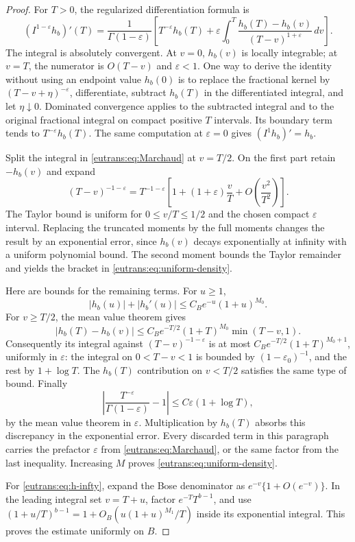 \begin{proof}
For $T>0$, the regularized differentiation formula is
\begin{equation}\label{eutrans:eq:Marchaud}
 (I^{1-\varepsilon}h_b)'(T)
 =\frac1{\Gamma(1-\varepsilon)}\left[
 T^{-\varepsilon}h_b(T)
 +\varepsilon\int_0^T
       \frac{h_b(T)-h_b(v)}{(T-v)^{1+\varepsilon}}\,dv\right].
\end{equation}
The integral is absolutely convergent. At $v=0$, $h_b(v)$ is
locally integrable; at $v=T$, the numerator is $O(T-v)$ and
$\varepsilon<1$. One way to derive the identity without using an
endpoint value $h_b(0)$ is to replace the fractional kernel by
$(T-v+\eta)^{-\varepsilon}$, differentiate, subtract $h_b(T)$ in
the differentiated integral, and let $\eta\downarrow0$. Dominated
convergence applies to the subtracted integral and to the original
fractional integral on compact positive $T$ intervals. Its boundary
term tends to $T^{-\varepsilon}h_b(T)$. The same computation at
$\varepsilon=0$ gives $(I^1h_b)'=h_b$.

Split the integral in \eqref{eutrans:eq:Marchaud} at $v=T/2$.
On the first part retain $-h_b(v)$ and expand
\[
 (T-v)^{-1-\varepsilon}=T^{-1-\varepsilon}
 \left[1+(1+\varepsilon)\frac vT
                  +O\left(\frac{v^2}{T^2}\right)\right].
\]
The Taylor bound is uniform for $0\leq v/T\leq1/2$ and the chosen
compact $\varepsilon$ interval. Replacing the truncated moments by
the full moments changes the result by an exponential error, since
$h_b(v)$ decays exponentially at infinity with a uniform polynomial
bound. The second moment bounds the Taylor remainder and yields
the bracket in \eqref{eutrans:eq:uniform-density}.

Here are bounds for the remaining terms. For $u\geq1$,
\[
 |h_b(u)|+|h_b'(u)|
       \leq C_B e^{-u}(1+u)^{M_0}.
\]
For $v\geq T/2$, the mean value theorem gives
\[
 |h_b(T)-h_b(v)|
 \leq C_B e^{-T/2}(1+T)^{M_0}\min(T-v,1).
\]
Consequently its integral against $(T-v)^{-1-\varepsilon}$ is at
most $C_Be^{-T/2}(1+T)^{M_0+1}$, uniformly in $\varepsilon$:
the integral on $0<T-v<1$ is bounded by $(1-\varepsilon_0)^{-1}$,
and the rest by $1+\log T$.
The $h_b(T)$ contribution on $v<T/2$ satisfies the same type of
bound. Finally
\[
 \left|\frac{T^{-\varepsilon}}{\Gamma(1-\varepsilon)}-1\right|
                \leq C\varepsilon(1+\log T),
\]
by the mean value theorem in $\varepsilon$. Multiplication by
$h_b(T)$ absorbs this discrepancy in the exponential error. Every
discarded term in this paragraph carries the prefactor
$\varepsilon$ from \eqref{eutrans:eq:Marchaud}, or the same factor
from the last inequality. Increasing $M$ proves
\eqref{eutrans:eq:uniform-density}.

For \eqref{eutrans:eq:h-infty}, expand the Bose denominator as
$e^{-v}\{1+O(e^{-v})\}$. In the leading integral set $v=T+u$,
factor $e^{-T}T^{b-1}$, and use
$(1+u/T)^{b-1}=1+O_B(u(1+u)^{M_1}/T)$ inside its exponential
integral. This proves the estimate uniformly on $B$.
\end{proof}

